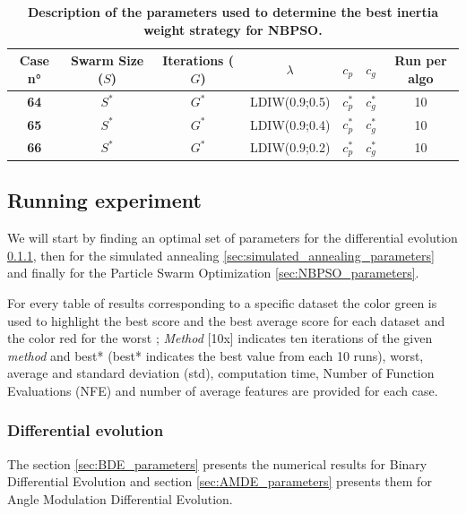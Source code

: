 \documentclass[12pt, openany]{article}
\begin{document}
\begin{table}[H]
    \centering
    \renewcommand{\arraystretch}{1.5}
    \begin{tabular}{|c|c|c|c|c|c|c|}
        \hline 
        \textbf{Case n°} & \textbf{Swarm Size ($S$)} & \textbf{Iterations ($G$)} & $\lambda$ & $c_p$ & $c_g$ & \textbf{Run per algo} \\ \hline

        \textbf{64} & $S^*$ & $G^*$ & LDIW(0.9;0.5) & $c_p^*$ & $c_g^*$ & 10 \\ \hdashline
        \textbf{65} & $S^*$ & $G^*$ & LDIW(0.9;0.4) & $c_p^*$ & $c_g^*$ & 10 \\ \hdashline
        \textbf{66} & $S^*$ & $G^*$ & LDIW(0.9;0.2) & $c_p^*$ & $c_g^*$ & 10 \\ 
        \hline
    \end{tabular}
    \caption{\textbf{Description of the parameters used to determine the best inertia weight strategy for NBPSO.}}
    \label{tab:Cases_Determine_NBPSO_Inertia}
\end{table}

\subsection{Running experiment}\label{sec:running_experiment}

We will start by finding an optimal set of parameters for the differential evolution \ref{sec:differential_evolution_parameters}, then for the simulated annealing \ref{sec:simulated_annealing_parameters} and finally for the Particle Swarm Optimization \ref{sec:NBPSO_parameters}.

For every table of results corresponding to a specific dataset the color green is used to highlight the best score and the best average score for each dataset and the color red for the worst ; \textit{Method} [10x] indicates ten iterations of the given \textit{method} and best* (best* indicates the best value from each 10 runs), worst, average and standard deviation (std), computation time, Number of Function Evaluations (NFE) and number of average features are provided for each case.

\subsubsection{Differential evolution}\label{sec:differential_evolution_parameters}

The section \ref{sec:BDE_parameters} presents the numerical results for Binary Differential Evolution and section \ref{sec:AMDE_parameters} presents them for Angle Modulation Differential Evolution.
\end{document}
